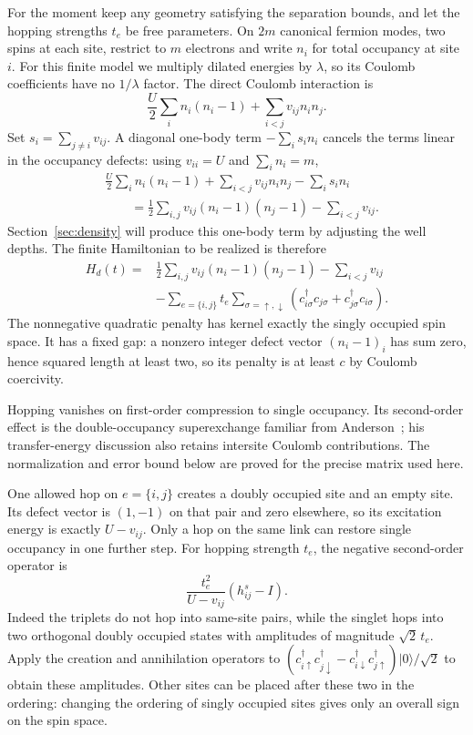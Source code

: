 For the moment keep any geometry satisfying the separation bounds, and
let the hopping strengths \(t_e\) be free parameters. On \(2m\)
canonical fermion modes, two spins at each site, restrict to \(m\)
electrons and write \(n_i\) for total occupancy at site \(i\). For
this finite model we multiply dilated energies by \(\lambda\), so
its Coulomb coefficients have no \(1/\lambda\) factor. The direct
Coulomb interaction is
\[
       \frac U2\sum_i n_i(n_i-1)+\sum_{i<j}v_{ij}n_i n_j.
\]
Set \(s_i=\sum_{j\ne i}v_{ij}\). A diagonal one-body term
\(-\sum_i s_i n_i\) cancels the terms linear in the occupancy defects:
using \(v_{ii}=U\) and \(\sum_i n_i=m\),
\begin{equation}\tag{C}\label{eq:occupancy-completion}
 \begin{aligned}
 &\frac U2\sum_i n_i(n_i-1)+\sum_{i<j}v_{ij}n_i n_j-\sum_i s_i n_i\\
 &\hspace{2em}=\frac12\sum_{i,j}v_{ij}(n_i-1)(n_j-1)-\sum_{i<j}v_{ij}.
 \end{aligned}
\end{equation}
Section~\ref{sec:density} will produce this one-body term by adjusting
the well depths. The finite Hamiltonian to be realized is therefore
\[
 \begin{split}
 H_d(t)={}&\frac12\sum_{i,j}v_{ij}(n_i-1)(n_j-1)-\sum_{i<j}v_{ij}\\
    &-\sum_{e=\{i,j\}}t_e
       \sum_{\sigma=\uparrow,\downarrow}
          (c_{i\sigma}^\dagger c_{j\sigma}+c_{j\sigma}^\dagger c_{i\sigma}).
 \end{split}                                                   \tag{2}\label{eq:2}
\]
The nonnegative quadratic penalty has kernel exactly the singly occupied
spin space. It has a fixed gap: a nonzero integer defect vector
\((n_i-1)_i\) has sum zero, hence squared length at least two, so its
penalty is at least \(c\) by Coulomb coercivity.

Hopping vanishes on first-order compression to single occupancy. Its
second-order effect is the double-occupancy superexchange familiar from
Anderson~\cite[Eqs.~(12)--(13), (18)--(21)]{Anderson1959}; his transfer-energy discussion
also retains intersite Coulomb contributions. The normalization and error
bound below are proved for the precise matrix used here.

One allowed hop on \(e=\{i,j\}\) creates a doubly occupied site and
an empty site. Its defect vector is \((1,-1)\) on that pair and zero
elsewhere, so its excitation energy is exactly \(U-v_{ij}\). Only a
hop on the same link can restore single occupancy in one further step.
For hopping strength \(t_e\), the negative second-order operator is
\[
                  \frac{t_e^2}{U-v_{ij}}(h^s_{ij}-I).
\]
Indeed the triplets do not hop into same-site pairs, while the singlet
hops into two orthogonal doubly occupied states with amplitudes of
magnitude \(\sqrt2\,t_e\). Apply the creation and annihilation
operators to
\((c_{i\uparrow}^\dagger c_{j\downarrow}^\dagger-
c_{i\downarrow}^\dagger c_{j\uparrow}^\dagger)|0\rangle/\sqrt2\)
to obtain these amplitudes. Other sites can be placed after these two in
the ordering: changing the ordering of singly occupied sites gives only
an overall sign on the spin space.

